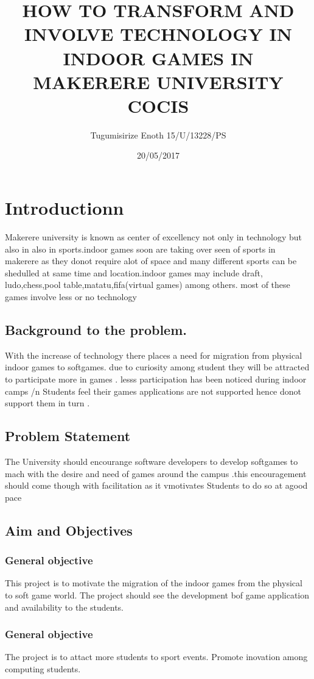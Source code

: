 \documentclass{article}
\title{HOW TO TRANSFORM  AND INVOLVE TECHNOLOGY IN INDOOR GAMES IN MAKERERE UNIVERSITY COCIS}
\author{ Tugumisirize Enoth 15/U/13228/PS}
\date{20/05/2017}
\begin{document}
  \maketitle
 
  
  \section{Introductionn}
Makerere university is known as center of excellency not only in technology  but also in also in sports.indoor games soon are taking over seen of sports in makerere as they donot require alot of space and many different sports can be shedulled at same time and location.indoor games may include draft, ludo,chess,pool table,matatu,fifa(virtual games) among others.
 most of these games involve less or no technology
      	\subsection{ Background to the problem.}
With the increase of technology there places a need for migration from physical indoor games to softgames. due to curiosity among student they will be attracted to participate more in games . lesss participation has been noticed during indoor camps
/n Students feel their games applications are not supported hence donot support them in turn .
	\subsection{ Problem Statement}
The University should encourange software developers to develop softgames to mach with the desire and need of games around the campus .this encouragement should come though with facilitation as it vmotivates Students to  do so at agood pace

	\subsection{Aim and Objectives}

	\subsubsection{  General objective}
This project is to motivate the migration of the indoor games from the physical to soft game world.
The project should see the development bof  game application and availability to the students.
\subsubsection{  General objective}
The project is to attact more students to sport events.
Promote inovation among computing students.
\end{document}
